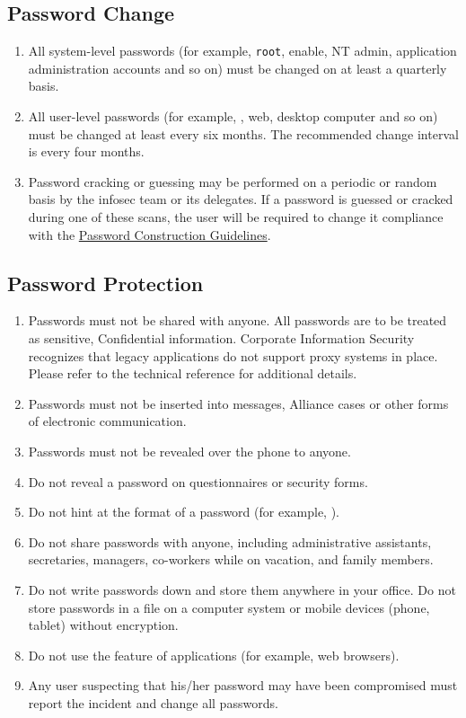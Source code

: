 \subsection{Password Change}
\begin{enumerate}
\item
All system-level passwords (for example, \texttt{root}, enable, NT admin, application administration accounts\oxford{} and so on) must be changed on at least a quarterly basis.
\item
All user-level passwords (for example, \email{}, web, desktop computer\oxford{} and so on) must be changed at least every six months.  
The recommended change interval is every four months.
\item
Password cracking or guessing may be performed on a periodic or random basis by the \gls{infosec} team or its delegates.  
If a password is guessed or cracked during one of these scans, the user will be required to change it  compliance with the \hyperref[G:PCG]{Password Construction Guidelines}.
\end{enumerate}
\subsection{Password Protection}
\begin{enumerate}
\item
Passwords must not be shared with anyone.  
All passwords are to be treated as sensitive, Confidential \CompanyName{} information.  
Corporate Information Security recognizes that legacy applications do not support proxy systems in place.  
Please refer to the technical reference for additional details.
\item
Passwords must not be inserted into \email{} messages, Alliance cases\oxford{} or other forms of electronic communication.
\item
Passwords must not be revealed over the phone to anyone.
\item
Do not reveal a password on questionnaires or security forms.
\item
Do not hint at the format of a password (for example, ).
\item
Do not share \CompanyName{} passwords with anyone, including administrative assistants, secretaries, managers, co-workers while on vacation, and family members.
\item
Do not write passwords down and store them anywhere in your office.  
Do not store passwords in a file on a computer system or mobile devices (phone, tablet) without encryption.
\item
Do not use the  feature of applications (for example, web browsers).
\item
Any user suspecting that his/her password may have been compromised must report the incident and change all passwords.
\end{enumerate}
